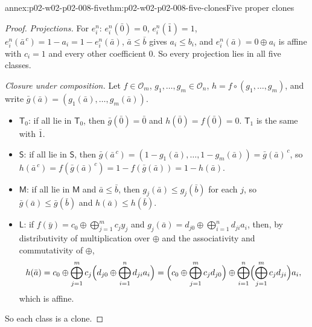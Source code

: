 \begin{annexitem}{annex:p02-w02-p02-008-five}{thm:p02-w02-p02-008-five-clones}{Five proper clones}
\begin{proof}
\emph{Projections.}  For \(e^n_i\): \(e^n_i(\bar0)=0\), \(e^n_i(\bar1)=1\),
\(e^n_i(\bar a^{\,c})=1-a_i=1-e^n_i(\bar a)\), \(\bar a\leq\bar b\) gives
\(a_i\leq b_i\), and \(e^n_i(\bar a)=0\oplus a_i\) is affine with
\(c_i=1\) and every other coefficient \(0\).  So every projection lies in all
five classes.

\emph{Closure under composition.}  Let \(f\in\mathcal O_m\),
\(g_1,\ldots,g_m\in\mathcal O_n\), \(h=f\circ(g_1,\ldots,g_m)\), and write
\(\bar g(\bar a)=(g_1(\bar a),\ldots,g_m(\bar a))\).
\begin{itemize}
\item \(\mathsf T_0\): if all lie in \(\mathsf T_0\), then
  \(\bar g(\bar0)=\bar0\) and \(h(\bar0)=f(\bar0)=0\).  \(\mathsf T_1\) is
  the same with \(\bar1\).
\item \(\mathsf S\): if all lie in \(\mathsf S\), then
  \(\bar g(\bar a^{\,c})=(1-g_1(\bar a),\ldots,1-g_m(\bar a))=
  \bar g(\bar a)^{\,c}\), so \(h(\bar a^{\,c})=f(\bar g(\bar a)^{\,c})=
  1-f(\bar g(\bar a))=1-h(\bar a)\).
\item \(\mathsf M\): if all lie in \(\mathsf M\) and \(\bar a\leq\bar b\),
  then \(g_j(\bar a)\leq g_j(\bar b)\) for each \(j\), so
  \(\bar g(\bar a)\leq\bar g(\bar b)\) and \(h(\bar a)\leq h(\bar b)\).
\item \(\mathsf L\): if \(f(\bar y)=c_0\oplus\bigoplus_{j=1}^mc_jy_j\) and
  \(g_j(\bar a)=d_{j0}\oplus\bigoplus_{i=1}^nd_{ji}a_i\), then, by
  distributivity of multiplication over \(\oplus\) and the associativity and
  commutativity of \(\oplus\),
  \[
   h(\bar a)=c_0\oplus\bigoplus_{j=1}^mc_j\Bigl(d_{j0}\oplus
   \bigoplus_{i=1}^nd_{ji}a_i\Bigr)
   =\Bigl(c_0\oplus\bigoplus_{j=1}^mc_jd_{j0}\Bigr)\oplus
   \bigoplus_{i=1}^n\Bigl(\bigoplus_{j=1}^mc_jd_{ji}\Bigr)a_i,
  \]
  which is affine.
\end{itemize}
So each class is a clone.


\end{proof}
\end{annexitem}
